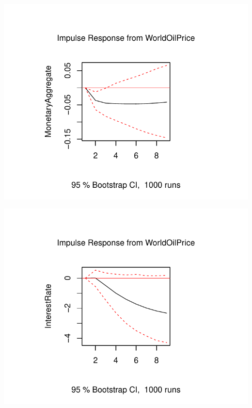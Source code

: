 \documentclass[11pt,preprint, authoryear]{elsarticle}
\numberwithin{equation}{section}
\numberwithin{figure}{section}
\numberwithin{table}{section}
\begin{document}
\begin{center}\includegraphics{README_files/figure-latex/unnamed-chunk-5-1} \end{center}

\begin{center}\includegraphics{README_files/figure-latex/unnamed-chunk-5-2} \end{center}
\end{document}
